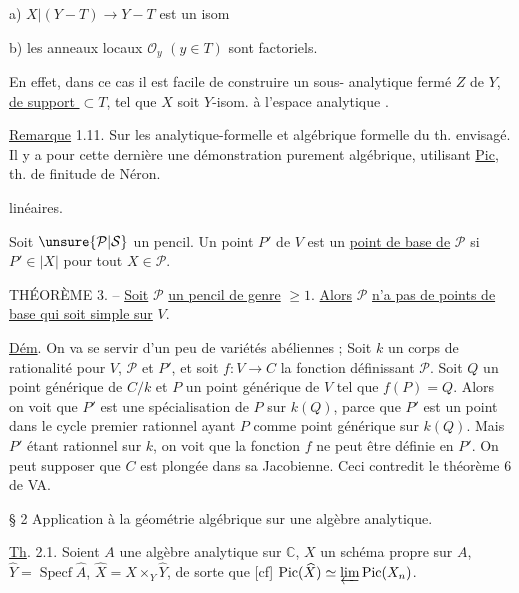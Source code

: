 a) $X|(Y-T)\longrightarrow Y-T$ est  un isom

b) les anneaux locaux $\mathcal O_y$ $(y\in T)$ sont factoriels.

En effet, dans ce cas il est facile de construire un sous- analytique fermé $Z$ de $Y$, \uline{de support $\subset T$}, tel que $X$ soit $Y$-isom. à l'espace analytique .

\uline{Remarque} 1.11. Sur les  analytique-formelle et algébrique formelle du th. envisagé. Il y a pour cette dernière une démonstration purement algébrique, utilisant \uline{Pic},  th. de finitude de Néron.


linéaires.

Soit $\unsure{\mathcal P|\mathcal S}$ un pencil. Un point $P'$ de $V$ est un \uline{point de base de} $\mathcal P$ si $P'\in|X|$ pour tout $X\in\mathcal P$.

THÉORÈME 3. -- \uline{Soit} $\mathcal P$ \uline{un pencil de genre} $\geq1$. \uline{Alors} $\mathcal P$ \uline{n'a pas de points de base qui soit simple sur} $V$.

\uline{Dém}. On va se servir d'un peu de variétés abéliennes ; Soit $k$ un corps de rationalité pour $V$, $\mathcal P$ et $P'$, et soit $f:V\longrightarrow C$ la fonction définissant $\mathcal P$. Soit $Q$ un point générique de $C/k$ et $P$ un point générique de $V$ tel que $f(P)=Q$. Alors on voit que $P'$ est une spécialisation de $P$ sur $k(Q)$, parce que $P'$ est un point dans le cycle premier rationnel ayant $P$ comme point générique sur $k(Q)$. Mais $P'$ étant rationnel sur $k$, on voit que la fonction $f$ ne peut être définie en $P'$. On peut supposer que $C$ est plongée dans sa Jacobienne. Ceci contredit le théorème 6 de VA.


§ 2 Application à la géométrie algébrique sur une algèbre analytique.

\uline{Th}. 2.1. Soient $A$ une algèbre analytique sur $\mathbb C$,  $X$ un schéma propre sur $A$,  $\widehat Y=\operatorname{Specf}\widehat A$, $\widehat X=X\times_Y\widehat Y$,  de sorte que [cf] \deleted{$\unsure{\varphi}$} $\operatorname{Pic}(\widehat X)\simeq\varprojlim\operatorname{Pic}(X_n)$.

